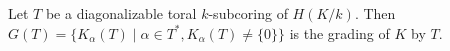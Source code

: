 Let $T$ be a diagonalizable toral $k$-subcoring of $H(K/k)$. Then $G(T) = \{K_\alpha(T) \mid \alpha \in T^*, K_\alpha(T) \neq \{0\}\}$ is the grading of $K$ by $T$.
